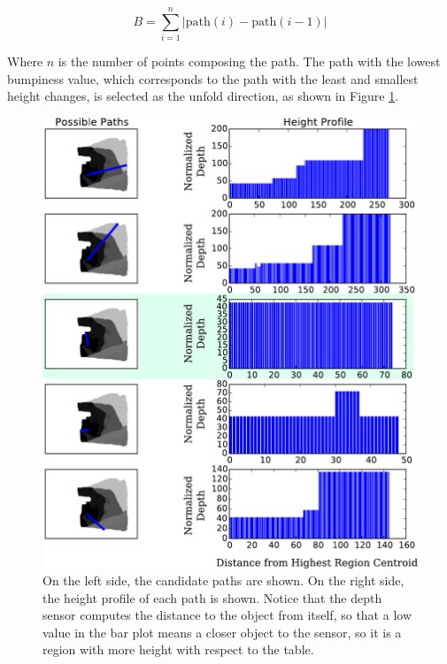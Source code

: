 \begin{equation}\label{eq:bumpiness}
B = \sum_{i=1}^{n} | \textrm{path}(i)- \textrm{path}(i-1) | 
\end{equation}


Where $n$ is the number of points composing the path. The path with the lowest bumpiness value, which corresponds to the path with the least and smallest height changes, is selected as the unfold direction, as shown in Figure \ref{fig:paths_with_bumpiness}.

\begin{figure}[thpb]
    \centering
    \includegraphics[width=\textwidth]{figures/candidate_paths.pdf}
    \caption{On the left side, the candidate paths are shown. On the right side, the height profile of each path is shown. Notice that the depth sensor computes the distance to the object from itself, so that a low value in the bar plot means a closer object to the sensor, so it is a region with more height with respect to the table.}
    \label{fig:paths_with_bumpiness}
\end{figure}

